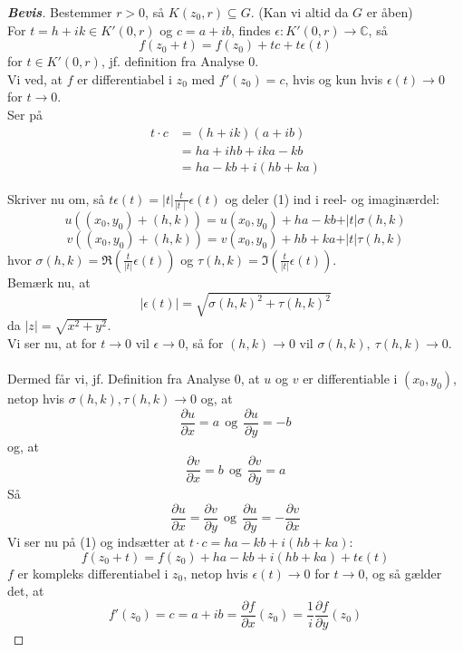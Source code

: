 \documentclass[10pt,a4paper]{article}
\theoremstyle{definition}
\begin{document}
\newpage
\begin{proof}[\textbf{Bevis}]
Bestemmer $r > 0$, så $K(z_0,r) \subseteq G$. (Kan vi altid da $G$ er åben) \\
For $ t = h + ik \in K'(0,r)$ og $c = a + ib$, findes $\epsilon : K'(0,r) \rightarrow \mathbb{C}$, så
\begin{equation} \label{eq}
 f (z_0 + t) = f(z_0) + tc + t \epsilon (t)
\end{equation}
for $t \in K'(0,r)$, jf. definition fra Analyse 0. \\
Vi ved, at $f$ er differentiabel i $z_0$ med $f'(z_0) = c$, hvis og kun hvis $\epsilon (t) \rightarrow 0$ for $t \rightarrow 0$. \\
Ser på
\begin{align*}
t \cdot c &= (h + ik)(a + ib) \\
&= ha + ihb + ika - kb \\
&= ha - kb + i (hb +ka) 
\end{align*}

Skriver nu om, så $t \epsilon (t) = \vert t \vert \frac{t}{\mid t \mid} \epsilon (t) $ og deler (1) ind i reel- og imaginærdel:
\begin{equation}
u((x_0,y_0) + (h,k)) = u(x_0,y_0) + ha - kb + \vert t \vert \sigma (h,k)
\end{equation}
\begin{equation}
v((x_0,y_0) + (h,k)) = v(x_0,y_0) + hb+ ka + \vert t \vert \tau (h,k)
\end{equation}
hvor $\sigma (h,k) = \Re(\frac{t}{\vert t \vert} \epsilon (t))$ og $\tau (h,k) = \Im(\frac{t}{\vert t \vert} \epsilon (t))$. \\
Bemærk nu, at 
$$ \vert \epsilon (t) \vert = \sqrt{\sigma (h,k)^2 + \tau (h,k)^2}$$
da $ \vert z \vert = \sqrt{x^2 + y^2}$. \\
Vi ser nu, at for $t \rightarrow 0$ vil $\epsilon \rightarrow 0$, så for $(h,k) \rightarrow 0$ vil $\sigma (h,k), \ \tau (h,k) \rightarrow 0$. \\ \\
Dermed får vi, jf. Definition fra Analyse 0, at $u$ og $v$ er differentiable i $(x_0,y_0)$, netop hvis $\sigma (h,k), \tau (h,k) \rightarrow 0$ og, at 
$$ \frac{\partial u}{\partial x} = a \ \ \text{og} \ \  \frac{\partial u}{\partial y} = -b$$
og, at
$$ \frac{\partial v}{\partial x} = b \ \ \text{og} \ \  \frac{\partial v}{\partial y} = a$$
Så
$$ \frac{\partial u}{\partial x} = \frac{\partial v}{\partial y}  \ \ \text{og} \ \ \frac{\partial u}{\partial y} = - \frac{\partial v}{\partial x} $$ 
Vi ser nu på (1) og indsætter at $t \cdot c = ha - kb + i(hb + ka)$:
$$f (z_0 + t) = f(z_0) + ha - kb + i(hb + ka) + t \epsilon (t)$$
$f$ er kompleks differentiabel i $z_0$, netop hvis $\epsilon(t) \rightarrow 0$ for $t \rightarrow 0$, og så gælder det, at 
$$ f'(z_0) = c = a + ib = \frac{\partial f}{\partial x} (z_0) = \frac{1}{i} \frac{\partial f}{\partial y} (z_0)$$
\end{proof}
\end{document}
